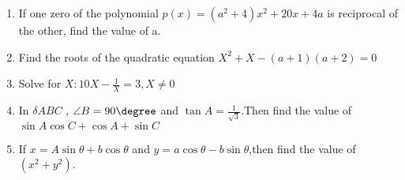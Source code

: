 \documentclass{article}
\begin{document}
\begin{enumerate}

\item If one zero of the polynomial $p(x) = (a^2+4)x^2+20x+4a$ is reciprocal of the other, find the value of a.

\item Find the roots of the quadratic equation
 $X^2+X-(a+1)(a+2)=0$
 
\item  Solve for $X : 10X-\frac{1}{X} = 3, X  \ne {0}$

\item In $\delta ABC $ , $\angle{B} = 90\degree$ and $ \tan A = \frac{1}{\sqrt 3}$.Then find the value of $\sin A \cos C + \cos A + \sin C $



\item If $ x = A\sin\theta +b\cos\theta$ and $ y = a\cos\theta - b\sin\theta$,then find the value of $(x^2+y^2)$.


\end{enumerate}
\end{document}
